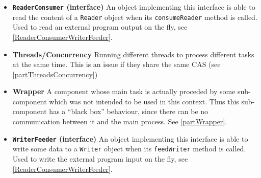 \documentclass{article}
\newenvironment{xitemize}{
\begin{itemize}
  \setlength{\itemsep}{.3\baselineskip}
  \setlength{\topsep}{0pt}
  \setlength{\parskip}{0pt}
  \setlength{\parsep}{0pt}
}{\end{itemize}}
\newcommand{\glossEntry}[2]{{\bf #1} #2}
\begin{document}
\begin{xitemize}
\item \glossEntry{{\tt ReaderConsumer} (interface)}{ An object implementing this interface is able to read the content of a {\tt Reader} object when its {\tt consumeReader} method is called. Used to read an external program output on the fly, see \ref{ReaderConsumerWriterFeeder}.}
\item \glossEntry{Threads/Concurrency}{Running different threads to process different tasks at the same time. This is an issue if they share the same CAS (see \ref{partThreadsConcurrency})}
\item \glossEntry{Wrapper}{A component whose main task is actually proceded by some sub-component which was not intended to be used in this context. Thus this sub-component has a ``black box'' behaviour, since there can be no communication between it and the main process. See \ref{partWrapper}.}
\item \glossEntry{{\tt WriterFeeder} (interface)}{ An object implementing this interface is able to write some data to a {\tt Writer} object when its {\tt feedWriter} method is called. Used to write the external program input on the fly, see \ref{ReaderConsumerWriterFeeder}.}
\end{xitemize}




\end{document}
